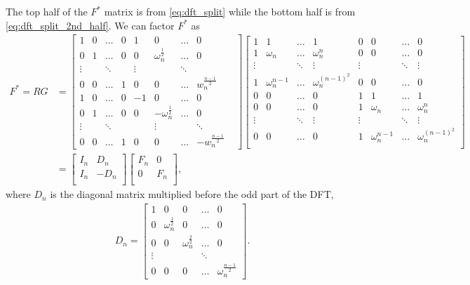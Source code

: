 \documentclass[10pt]{article}
\begin{document}
The top half of the \(F^*\) matrix is from \eqref{eq:dft_split} while the bottom half is from \eqref{eq:dft_split_2nd_half}. We can factor \(F^*\) as
\begin{align*}
    F^* = RG &=
    \begin{bmatrix}
        1 & 0 & \dots & 0 & 1 & 0 & \dots & 0 \\
        0 & 1 & \dots & 0 & 0 & \omega_n^{\frac{1}{2}} & \dots & 0 \\
        \vdots & & \ddots & & \vdots & & \ddots & \\
        0 & 0 & \dots & 1 & 0 & 0 & \dots & w_n^{\frac{n-1}{2}} \\
        1 & 0 & \dots & 0 & -1 & 0 & \dots & 0 \\
        0 & 1 & \dots & 0 & 0 & -\omega_n^{\frac{1}{2}} & \dots & 0 \\
        \vdots & & \ddots & & & \vdots & & \ddots & \\
        0 & 0 & \dots & 1 & 0 & 0 & \dots & -w_n^{\frac{n-1}{2}}
    \end{bmatrix} \begin{bmatrix}
        1 & 1 & \dots & 1 & 0 & 0 & \dots & 0 \\
        1 & \omega_n & \dots & \omega_n^n & 0 & 0 & \dots & 0 \\
        \vdots & & \ddots & \vdots & \vdots & & \ddots & \vdots \\
        1 & \omega_n^{n-1} & \dots & \omega_n^{(n-1)^2} & 0 & 0 & \dots & 0 \\
        0 & 0 & \dots & 0 & 1 & 1 & \dots & 1  \\
        0 & 0 & \dots & 0 & 1 & \omega_n & \dots & \omega_n^n  \\
        \vdots & & \ddots & \vdots & \vdots & & \ddots & \vdots \\
        0 & 0 & \dots & 0 & 1 & \omega_n^{n-1} & \dots & \omega_n^{(n-1)^2} \\
    \end{bmatrix} \\
    &= \begin{bmatrix}
        I_{n} & D_{n} \\
        I_{n} & -D_{n} \\
    \end{bmatrix} \begin{bmatrix}
        F_n & 0 \\
        0 & F_n \\
    \end{bmatrix},
\end{align*} where \(D_n\) is the diagonal matrix multiplied before the odd part of the DFT, \begin{align*}
    D_n = \begin{bmatrix}
        1 & 0 & 0 & \dots & 0 \\
        0 & \omega_n^{\frac{1}{2}} & 0 & \dots & 0 \\
        0 & 0 & \omega_n^{\frac{2}{2}} & \dots & 0 \\
        \vdots & & & \ddots & \\
        0 & 0 & 0 & \dots & \omega_n^{\frac{n-1}{2}}
    \end{bmatrix}.
\end{align*}
\end{document}
